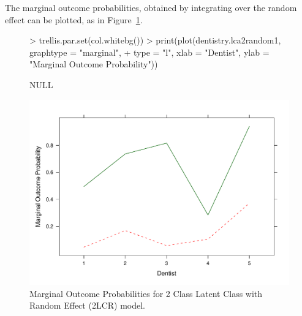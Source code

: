 \documentclass[a4paper]{article}
\begin{document}
The marginal outcome probabilities, obtained by integrating over the random effect can be plotted, as in Figure~\ref{fig:outcome2}.



\begin{figure}
  \centering
\begin{Schunk}
\begin{Sinput}
> trellis.par.set(col.whitebg())
> print(plot(dentistry.lca2random1, graphtype = "marginal", 
+     type = "l", xlab = "Dentist", ylab = "Marginal Outcome Probability"))
\end{Sinput}
\begin{Soutput}
NULL
\end{Soutput}
\end{Schunk}
\includegraphics{randomLCA-example-input-010}
  \caption{Marginal Outcome Probabilities for 2 Class Latent Class with Random Effect (2LCR) model.}
  \label{fig:outcome2}
\end{figure}
\end{document}
